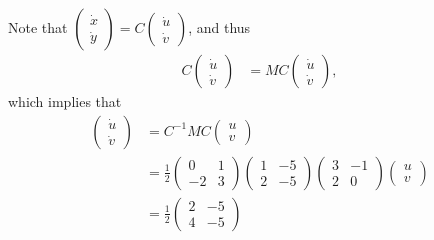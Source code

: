 \documentclass[12pt,letterpaper]{article}
\begin{document}
\begin{enumerate}[label=(\alph*)]
	      Note that $\begin{pmatrix}
			      \dot{x} \\
			      \dot{y}
		      \end{pmatrix} = C \begin{pmatrix}
			      \dot{u} \\
			      \dot{v}
		      \end{pmatrix}$, and thus
	      \begin{align}
		      C\begin{pmatrix}
			      \dot{u} \\
			      \dot{v}
		      \end{pmatrix} & =
		      M C \begin{pmatrix}
			      \dot{u} \\
			      \dot{v}
		      \end{pmatrix},
	      \end{align} which implies that
	      \begin{align}
		      \begin{pmatrix}
			      \dot{u} \\
			      \dot{v}
		      \end{pmatrix} & =
		      C^{-1}M C \begin{pmatrix}
			      u \\
			      v
		      \end{pmatrix}\\
		                                 & =
		      \frac{1}{2}\begin{pmatrix}
			      0  & 1 \\
			      -2 & 3
		      \end{pmatrix} \begin{pmatrix}
			      1 & -5 \\
			      2 & -5
		      \end{pmatrix}
		      \begin{pmatrix}
			      3 & -1 \\
			      2 & 0
		      \end{pmatrix}\begin{pmatrix}
			      u \\
			      v
		      \end{pmatrix}\\
		                                 & =
		      \frac{1}{2}\begin{pmatrix}
			      2 & -5 \\
			      4 & -5
		      \end{pmatrix}

\end{align}
\end{enumerate}
\end{document}
